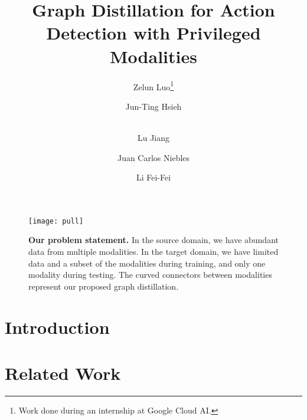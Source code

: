 \documentclass[runningheads]{llncs}
\begin{document}
%
\title{Graph Distillation for Action Detection with Privileged Modalities} 
%
\author{Zelun Luo\thanks{\scriptsize Work done during an internship at Google Cloud AI.} \and
Jun-Ting Hsieh \and \\
Lu Jiang \and
Juan Carlos Niebles \and
Li Fei-Fei}
%
%
%
\maketitle              %

\begin{figure}[ht]
\begin{center}
\texttt{[image: pull]}
\end{center}
\caption{\textbf{Our problem statement.} In the source domain, we have abundant data from multiple modalities. In the target domain, we have limited data and a subset of the modalities during training, and only one modality during testing. The curved connectors between modalities represent our proposed graph distillation.}
\label{fig:pull}
\end{figure}

\begin{abstract}

\end{abstract}

\section{Introduction}


\section{Related Work}

\end{document}
